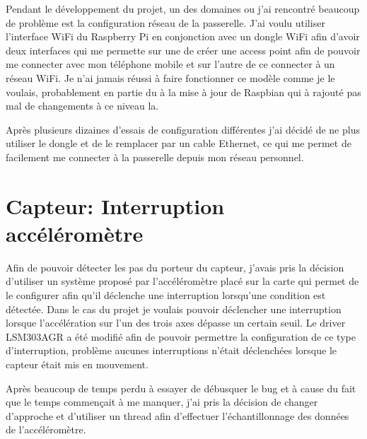 Pendant le développement du projet, un des domaines ou j'ai rencontré beaucoup de problème est la configuration réseau de la passerelle. J'ai voulu utiliser l'interface WiFi du Raspberry Pi en conjonction avec un dongle WiFi afin d'avoir deux interfaces qui me permette sur une de créer une access point afin de pouvoir me connecter avec mon téléphone mobile et sur l'autre de ce connecter à un réseau WiFi. Je n'ai jamais réussi à faire fonctionner ce modèle comme je le voulais, probablement en partie du à la mise à jour de Raspbian qui à rajouté pas mal de changements à ce niveau la.

Après plusieurs dizaines d'essais de configuration différentes j'ai décidé de ne plus utiliser le dongle et de le remplacer par un cable Ethernet, ce qui me permet de facilement me connecter à la passerelle depuis mon réseau personnel.

\section{Capteur: Interruption accéléromètre}

Afin de pouvoir détecter les pas du porteur du capteur, j'avais pris la décision d'utiliser un système proposé par l'accéléromètre placé sur la carte qui permet de le configurer afin qu'il déclenche une interruption lorsqu'une condition est détectée. Dans le cas du projet je voulais pouvoir déclencher une interruption lorsque l'accélération sur l'un des trois axes dépasse un certain seuil. Le driver LSM303AGR a été modifié afin de pouvoir permettre la configuration de ce type d'interruption, problème aucunes interruptions n'était déclenchées lorsque le capteur était mis en mouvement.

Après beaucoup de temps perdu à essayer de débusquer le bug et à cause du fait que le temps commençait à me manquer, j'ai pris la décision de changer d'approche et d'utiliser un thread afin d'effectuer l'échantillonnage des données de l'accéléromètre.